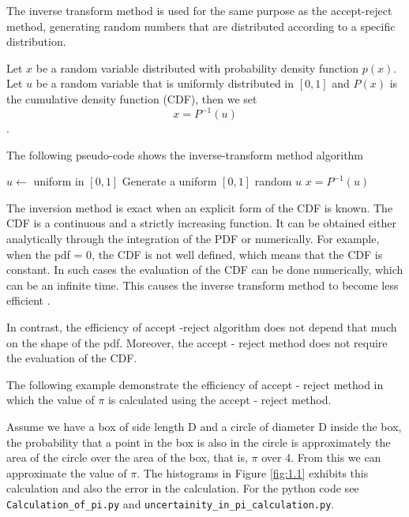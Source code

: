 The inverse transform method is used for the same purpose as the accept-reject method, generating random numbers that are distributed according to a specific distribution. 

Let $x$ be a random variable distributed with probability density function $p(x)$. Let $u$ be a random variable that is uniformly distributed in $[0,1]$ and $P(x)$ is the cumulative density function (CDF), then we set 
\begin{equation}
x = P^{-1} (u)
\end{equation}\citep{Weinzierl}.

   
The following pseudo-code shows the inverse-transform method algorithm 
\begin{algorithmic}
\State $u \gets$ uniform in $[0, 1]$
\State Generate a uniform $[0,1]$ random $u$
\State \Return $x = P^{-1}(u)$
\end{algorithmic}

The inversion method is exact when an explicit form of the CDF is known. The CDF is a continuous and a strictly increasing function. It can be obtained either analytically through the integration of the PDF or numerically. For example, when the pdf = 0, the CDF is not well defined, which means that the CDF is constant. In such cases the evaluation of the CDF can be done numerically, which can be an infinite time. This causes the inverse transform method to become less efficient \citep{Devroye:1986:SNR:318242.318443}. 

In contrast, the efficiency of accept -reject algorithm does not depend that much on the shape of the pdf. Moreover, the accept - reject method does not require the evaluation of the CDF. 

The following example demonstrate the efficiency of accept - reject method in which the value of $\pi$ is calculated using the accept - reject method.

Assume we have a box of side length D and a circle of diameter D inside the box, the probability that a point in the box is also in the circle is approximately the area of the circle over the area of the box, that is, $\pi$ over 4. From this we can approximate the value of $\pi$. The histograms in Figure \ref{fig:1.1} exhibits this calculation and also the error in the calculation. For the python code see \verb+Calculation_of_pi.py+ and \verb+uncertainity_in_pi_calculation.py+.

